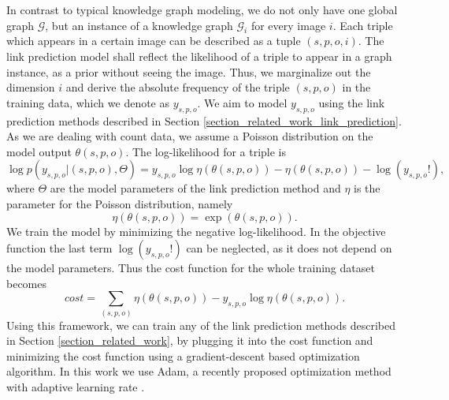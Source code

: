 \documentclass[runningheads,a4paper]{llncs}
\begin{document}
In contrast to typical knowledge graph modeling, we do not only have one global graph $\mathcal{G}$, but an instance of a knowledge graph $\mathcal{G}_i$ for every image $i$. Each triple which appears in a certain image can be described as a tuple $(s, p, o, i)$. The link prediction model shall reflect the likelihood of a triple to appear in a graph instance, as a prior without seeing the image. Thus, we marginalize out the dimension $i$ and derive the absolute frequency of the triple $(s,p,o)$ in the training data, which we denote as $y_{s,p,o}$. We aim to model $y_{s,p,o}$ using the link prediction methods described in Section \ref{section_related_work_link_prediction}. As we are dealing with count data, we assume a Poisson distribution on the model output $\theta(s,p,o)$. The log-likelihood for a triple is
\begin{equation}
\log p(y_{s,p,o} | (s,p,o), \Theta) = y_{s,p,o} \log \eta(\theta(s,p,o)) - \eta(\theta(s,p,o)) - \log(y_{s,p,o}!),
\end{equation}
where $\Theta$ are the model parameters of the link prediction method and $\eta$ is the parameter for the Poisson distribution, namely
\begin{equation}
\eta(\theta(s,p,o)) = \exp(\theta(s,p,o)). 
\end{equation}
We train the model by minimizing the negative log-likelihood. In the objective function the last term $\log(y_{s,p,o}!)$ can be neglected, as it does not depend on the model parameters. Thus the cost function for the whole training dataset becomes
\begin{equation}
\textit{cost} = \sum_{(s,p,o)} \eta(\theta(s,p,o)) - y_{s,p,o} \log \eta(\theta(s,p,o)).
\end{equation}
Using this framework, we can train any of the link prediction methods described in Section \ref{section_related_work}, by plugging it into the cost function and minimizing the cost function using a gradient-descent based optimization algorithm. In this work we use Adam, a recently proposed optimization method with adaptive learning rate \cite{adam}.




\end{document}
